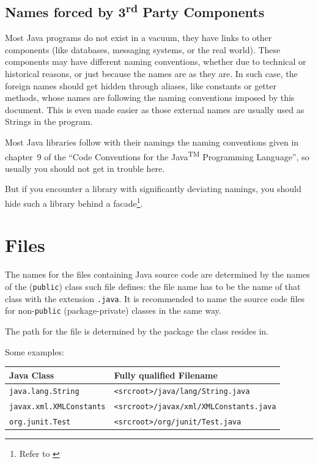 \documentclass[11pt,a4paper, titlepage, parskip=half, headsepline, footsepline, cleardoublepage=current, headheight=1cm]{scrbook}
\begin{document}
\subsection{Names forced by 3\textsuperscript{rd} Party Components}
Most Java programs do not exist in a vacuum, they have links to other components (like databases, messaging systems, or the real world). These components may have different naming conventions, whether due to technical or historical reasons, or just because the names are as they are. In such case, the foreign names should get hidden through aliases, like constants or getter methods, whose names are following the naming conventions imposed by this document. This is even made easier as those external names are usually used as Strings in the program.

Most Java libraries follow with their namings the naming conventions given in chapter~9 of the “Code Conventions for the Java\textsuperscript{TM} Programming Language”\autocite{SUN_CODE_CONVENTIONS:NamingConventions}, so usually you should not get in trouble here.

But if you encounter a library with significantly deviating namings, you should hide such a library behind a facade\footnote{Refer to \autocite{Gamma:DesignPatterns}}.


\section{Files}\label{sec:FileNames}
The names for the files containing Java source code are determined by the names of the (\lstinline|public|) class such file defines: the file name has to be the name of that class with the extension \verb#.java#. It is recommended to name the source code files for non-\lstinline|public| (package-private) classes in the same way.

The path for the file is determined by the package the class resides in.

Some examples:

\begin{tabular}{|l|l|}
\hline 
\textbf{Java Class} & \textbf{Fully qualified Filename} \\ 
\hline 
\lstinline|java.lang.String| & \verb#<srcroot>/java/lang/String.java# \\ 
\lstinline|javax.xml.XMLConstants| & \verb#<srcroot>/javax/xml/XMLConstants.java# \\ 
\lstinline|org.junit.Test| & \verb#<srcroot>/org/junit/Test.java# \\ 
\hline 
\end{tabular}
\end{document}
